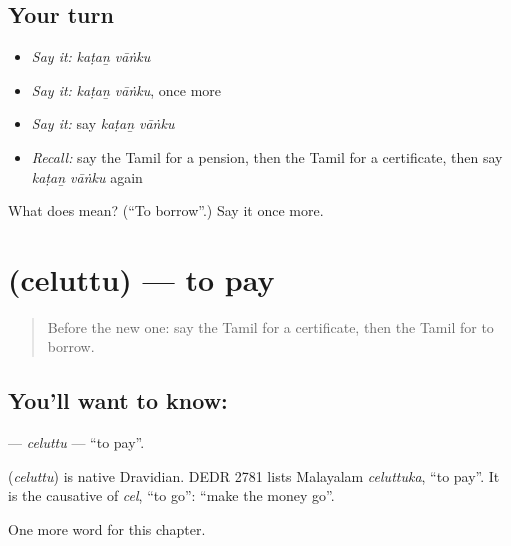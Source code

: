 \subsection*{Your turn}
\begin{itemize}
\raggedright
  \item \emph{Say it:} \emph{kaṭaṉ vāṅku}
  \item \emph{Say it:} \emph{kaṭaṉ vāṅku}, once more
  \item \emph{Say it:} say \emph{kaṭaṉ vāṅku}
  \item \emph{Recall:} say the Tamil for a pension, then the Tamil for a certificate, then say \emph{kaṭaṉ vāṅku} again
\end{itemize}

\begin{tcolorbox}[breakable,colback=teal!4,colframe=teal!35!black,title={Before you move on}]
What does   mean? (\textquotedblleft{}To borrow\textquotedblright{}.) Say it once more.
\end{tcolorbox}
\section[\texorpdfstring{\ta{செலுத்து} (celuttu)}{செலுத்து (celuttu)}]{ (celuttu) — to pay}

\label{lesson:TA-C254-celuttu}



\begin{quote}
Before the new one: say the Tamil for a certificate, then the Tamil for to borrow.
\end{quote}

\subsection*{You'll want to know: }
\textbf{} — \emph{celuttu} — \textquotedblleft{}to pay\textquotedblright{}.

\begin{cousinweb}
\textbf{} (\emph{celuttu}) is native Dravidian. DEDR 2781 lists Malayalam \emph{celuttuka}, \textquotedblleft{}to pay\textquotedblright{}. It is the causative of \emph{cel}, \textquotedblleft{}to go\textquotedblright{}: \textquotedblleft{}make the money go\textquotedblright{}.
\end{cousinweb}

\begin{grammarlens}[title={What you've built}]
One more word for this chapter.
\end{grammarlens}

